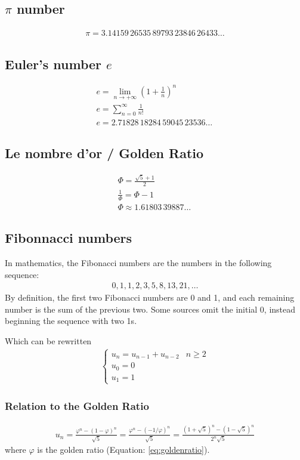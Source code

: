 \subsection{$\pi$ number}
\begin{eqnarray}
	\pi = 3.14159\,26535\,89793\,23846\,26433\ldots
\end{eqnarray}
\subsection{Euler's number $e$}
\begin{eqnarray}
	e=\lim_{n\rightarrow+\infty}\left(1+\frac{1}{n}\right)^n\\
	e=\sum_{n=0}^{\infty}\frac{1}{n!}\\
	e=2.71828\,18284\,59045\,23536\ldots\,
\end{eqnarray}

\subsection{Le nombre d'or / Golden Ratio}
\begin{eqnarray}
	\label{eq:goldenratio}
	\Phi=\frac{\sqrt5 + 1}{2}\\
	\frac{1}{\Phi}=\Phi - 1\\
	\Phi \approx 1.61803\,39887\ldots\,
\end{eqnarray}

\subsection{Fibonnacci numbers}
In mathematics, the Fibonacci numbers are the numbers in the following sequence:
\begin{eqnarray}
	0, 1, 1, 2, 3, 5, 8, 13, 21,\dots
\end{eqnarray}
By definition, the first two Fibonacci numbers are 0 and 1, and each remaining number is the sum of the previous two. Some sources omit the initial 0, instead beginning the sequence with two 1s.

Which can be rewritten
\begin{eqnarray}
	\begin{cases}
		u_{n}=u_{n-1}+u_{n-2} & n\geq2\\
		u_0=0\\
		u_1=1
	\end{cases}
\end{eqnarray}

\subsubsection{Relation to the Golden Ratio}
\begin{eqnarray}
	u_n=\frac{\varphi^n-(1-\varphi)^n}{\sqrt{5}}=\frac{\varphi^n-(-1/\varphi)^n}{\sqrt{5}}=\frac{(1+\sqrt{5})^n-(1-\sqrt{5})^n}{2^n\sqrt{5}}
\end{eqnarray}
where $\varphi$ is the golden ratio (Equation: \ref{eq:goldenratio}).

